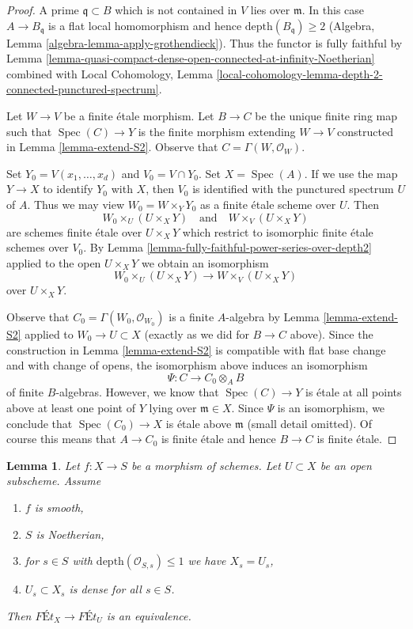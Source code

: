 \documentclass{stacks-project}
\theoremstyle{plain}
\newtheorem{lemma}[subsection]{Lemma}
\theoremstyle{definition}
\theoremstyle{remark}
\numberwithin{equation}{subsection}
\def\Spec{\mathop{\mathrm{Spec}}}
\begin{document}
\begin{proof}
A prime $\mathfrak q \subset B$ which is not contained in $V$
lies over $\mathfrak m$. In this case $A \to B_\mathfrak q$
is a flat local homomorphism and hence $\text{depth}(B_\mathfrak q) \geq 2$
(Algebra, Lemma \ref{algebra-lemma-apply-grothendieck}).
Thus the functor is fully faithful by
Lemma \ref{lemma-quasi-compact-dense-open-connected-at-infinity-Noetherian}
combined with Local Cohomology,
Lemma \ref{local-cohomology-lemma-depth-2-connected-punctured-spectrum}.

\medskip\noindent
Let $W \to V$ be a finite \'etale morphism. Let $B \to C$ be the unique finite
ring map such that $\Spec(C) \to Y$ is the finite morphism extending
$W \to V$ constructed in Lemma \ref{lemma-extend-S2}.
Observe that $C = \Gamma(W, \mathcal{O}_W)$.

\medskip\noindent
Set $Y_0 = V(x_1, \ldots, x_d)$ and $V_0 = V \cap Y_0$. Set $X = \Spec(A)$.
If we use the map $Y \to X$ to identify $Y_0$ with $X$,
then $V_0$ is identified with the punctured spectrum $U$ of $A$.
Thus we may view $W_0 = W \times_Y Y_0$ as a finite \'etale scheme
over $U$. Then
$$
W_0 \times_U (U \times_X Y)
\quad\text{and}\quad
W \times_V (U \times_X Y)
$$
are schemes finite \'etale over $U \times_X Y$ which restrict to
isomorphic finite \'etale schemes over $V_0$. By
Lemma \ref{lemma-fully-faithful-power-series-over-depth2}
applied to the open $U \times_X Y$ we obtain an isomorphism
$$
W_0 \times_U (U \times_X Y) \longrightarrow W \times_V (U \times_X Y)
$$
over $U \times_X Y$.

\medskip\noindent
Observe that $C_0 = \Gamma(W_0, \mathcal{O}_{W_0})$ is a finite $A$-algebra
by Lemma \ref{lemma-extend-S2} applied to $W_0 \to U \subset X$ (exactly
as we did for $B \to C$ above). Since the construction in
Lemma \ref{lemma-extend-S2} is compatible with flat base change
and with change of opens, the isomorphism above induces
an isomorphism
$$
\Psi : C \longrightarrow C_0 \otimes_A B
$$
of finite $B$-algebras. However, we know that $\Spec(C) \to Y$
is \'etale at all points above at least one point of $Y$ lying
over $\mathfrak m \in X$. Since $\Psi$ is an isomorphism, we
conclude that $\Spec(C_0) \to X$
is \'etale above $\mathfrak m$ (small detail omitted).
Of course this means that $A \to C_0$ is finite
\'etale and hence $B \to C$ is finite \'etale.
\end{proof}

\begin{lemma}
\label{lemma-purity-smooth-over-depth2}
Let $f : X \to S$ be a morphism of schemes. Let $U \subset X$
be an open subscheme. Assume
\begin{enumerate}
\item $f$ is smooth,
\item $S$ is Noetherian,
\item for $s \in S$ with $\text{depth}(\mathcal{O}_{S, s}) \leq 1$
we have $X_s = U_s$,
\item $U_s \subset X_s$ is dense for all $s \in S$.
\end{enumerate}
Then $\textit{F\'Et}_X \to \textit{F\'Et}_U$ is an equivalence.
\end{lemma}
\end{document}
